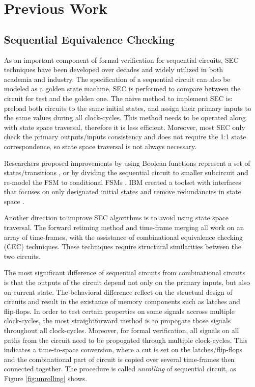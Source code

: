\chapter{Previous Work}
\label{ch:prev}
\section{Sequential Equivalence Checking}
As an important component of formal verification for sequential circuits, SEC techniques 
have been developed over decades and widely utilized in both academia and industry. 
The specification of a sequential circuit can also be modeled as a golden state machine,
SEC is performed to compare between the circuit for test and the golden one.
The n\"aive method to implement SEC is: preload both circuits to the same initial states, 
and assign their primary inputs to the same values during all clock-cycles.
This method needs to be operated along with state space traversal,  therefore it is 
less efficient. Moreover,  most SEC only check the primary outputs/inputs consistency 
and does not require the 1:1 state correspondence,  so state space traversal is not always necessary.

Researchers proposed improvements by using Boolean functions represent 
a set of states/transitions \cite{coudert2003unified, coudert1990verification},  or by dividing the sequential circuit to 
smaller subcircuit and re-model the FSM to conditional FSMs \cite{khasidashvili2004theoretical}. IBM created a toolset with 
interfaces that focuses on only designated initial states and remove redundancies in state space \cite{baumgartner2007scalable}.

Another direction to improve SEC algorithms is to avoid using state space traversal. 
The forward retiming method \cite{van1998sequential} and time-frame merging \cite{stoffel1997record} 
all work on an array of time-frames,  with the assistance of combinational equivalence checking (CEC)
techniques. These techniques require structural similarities between the two circuits.

The most significant difference of sequential circuits from combinational circuits is 
that the outputs of the circuit depend not only 
on the primary inputs, but also on current state. 
The behavioral difference reflect on the structual design of circuits and result in 
the existance of memory components such as latches and flip-flops.
In order to test certain properties on some signals accross multiple clock-cycles,
the most straightforward method is to propogate those signals throughout 
all clock-cycles. Moreover, for formal verification, all signals on all paths from the circuit
need to be propogated through multiple clock-cycles.
This indicates a time-to-space conversion, where 
a cut is set on the latches/flip-flops and the combinational part of circuit
is copied over several time-frames then connected together.
The procedure is called {\it unrolling} of sequential circuit, as 
Figure \ref{fig:unrolling} shows.


